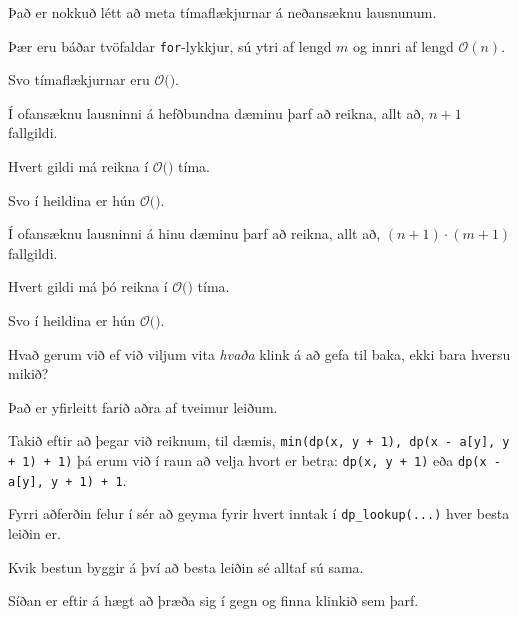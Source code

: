 {
}

{
	{
		\item<1-> Það er nokkuð létt að meta tímaflækjurnar á neðansæknu lausnunum.
		\item<2-> Þær eru báðar tvöfaldar \texttt{for}-lykkjur, sú ytri af lengd $m$ og innri af lengd $\mathcal{O}(n)$.
		\item<3-> Svo tímaflækjurnar eru $\mathcal{O}($\onslide<4->{$n \cdot m$}$)$.
	}
}

{
	{
		\item<1-> Í ofansæknu lausninni á hefðbundna dæminu þarf að reikna, allt að, $n + 1$ fallgildi.
		\item<2-> Hvert gildi má reikna í $\mathcal{O}($$)$ tíma.
		\item<4-> Svo í heildina er hún $\mathcal{O}($\onslide<5->{$n \cdot m$}$)$.
		\item<1->[] 
	}
}

{
	{
		\item<1-> Í ofansæknu lausninni á hinu dæminu þarf að reikna, allt að, $(n + 1) \cdot (m + 1)$ fallgildi.
		\item<2-> Hvert gildi má þó reikna í $\mathcal{O}($$)$ tíma.
		\item<4-> Svo í heildina er hún $\mathcal{O}($\onslide<5->{$n \cdot m$}$)$.
		\item<1->[] 
	}
}

{
	{
		\item<1-> Hvað gerum við ef við viljum vita \emph{hvaða} klink á að gefa til baka, ekki bara hversu mikið?
		\item<2-> Það er yfirleitt farið aðra af tveimur leiðum.
		\item<3-> Takið eftir að þegar við reiknum, til dæmis, \texttt{min(dp(x, y + 1), dp(x - a[y], y + 1) + 1)}
					þá erum við í raun að velja hvort er betra: \texttt{dp(x, y + 1)} eða \texttt{dp(x - a[y], y + 1) + 1}.
		\item<4-> Fyrri aðferðin felur í sér að geyma fyrir hvert inntak í \texttt{dp\_lookup(...)} hver besta leiðin er.
		\item<5-> Kvik bestun byggir á því að besta leiðin sé alltaf sú sama.
		\item<6-> Síðan er eftir á hægt að þræða sig í gegn og finna klinkið sem þarf.
	}
}


